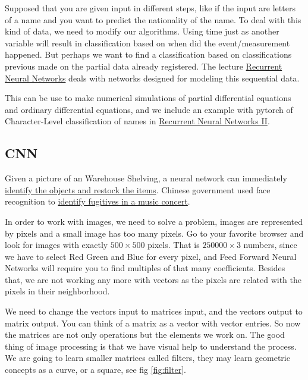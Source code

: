 \documentclass[11pt,letterpaper]{report}
\begin{document}
    Supposed that you are given  input in different steps, like if the input are letters of a name and you want to predict the nationality of the name. To deal with this kind of data, we need to modify our algorithms. Using time just as another variable will result in classification based on when did the event/measurement happened. But perhaps we want to find a classification based on classifications previous made on the partial data already registered. The lecture \href{ http://nbviewer.jupyter.org/mendozacortesgroup/machine_learning_class/blob/master/Lectures_Jupyter/L17_RNN/Recurrent\%20Neural\%20Networks.ipynb}{Recurrent Neural Networks} deals with networks designed for modeling this sequential data.  
    
    This can be use to make numerical simulations of partial differential equations and ordinary differential equations, and we include an example with pytorch of Character-Level classification of names in \href{ http://nbviewer.jupyter.org/mendozacortesgroup/machine_learning_class/blob/master/Lectures_Jupyter/L17_RNN/L17_RNN_II.ipynb}{Recurrent Neural Networks II}.

	\subsection{CNN}
	
	Given a picture of an Warehouse Shelving, a  neural network can immediately 
	\href{https://developers.google.com/machine-learning/crash-course/fairness/video-lecture?utm_source=keyword-blog&utm_medium=blog&utm_campaign=mle-outreach&utm_term=&utm_content=mlcc-fairness}{identify the objects and restock the items}.
	Chinese government used face recognition to \href{http://fortune.com/2018/10/28/in-china-facial-recognition-tech-is-watching-you/}{identify fugitives in a music concert}.
	
	In order to work with images, we need to solve a problem, images are represented by pixels and a small image has too many pixels. Go to your favorite browser and look for images with exactly  $500\times500$ pixels. That is $250000\times3$ numbers, since we have to select Red Green and Blue for every pixel, and Feed Forward Neural Networks will require you to find multiples of that many coefficients. Besides that, we are not working any more with vectors as the pixels are related with the pixels in their neighborhood.
	
	We need to change the vectors input to matrices input,  and the vectors output to matrix output. You can think of a matrix as a vector with vector entries.  So now the matrices are not only operations but the elements we work on.
	The good thing of image processing is that we have visual help to understand the process. We are going to learn smaller matrices called filters, they may learn geometric concepts as a curve, or a square, see fig \ref{fig:filter}.  
	
\end{document}
